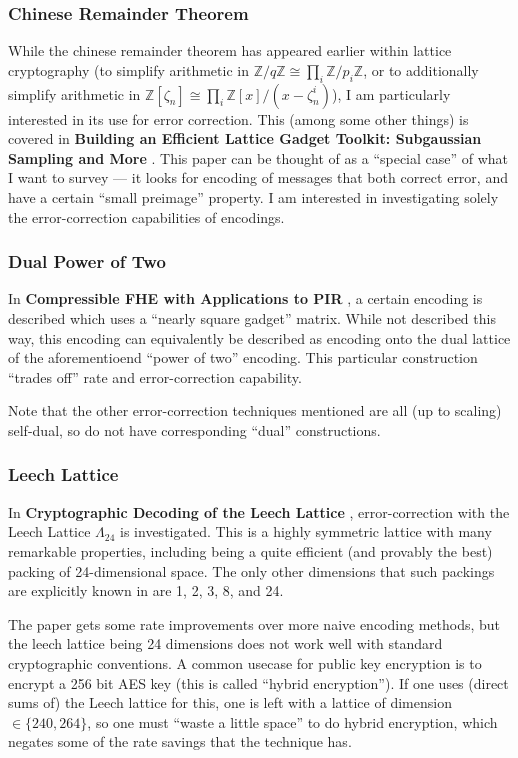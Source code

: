 \documentclass{article}
\begin{document}
\subsubsection{Chinese Remainder Theorem}
While the chinese remainder theorem has appeared earlier within lattice cryptography (to simplify arithmetic in $\mathbb{Z}/q\mathbb{Z}\cong \prod_i \mathbb{Z}/p_i\mathbb{Z}$, or to additionally simplify arithmetic in $\mathbb{Z}[\zeta_n]\cong \prod_i \mathbb{Z}[x] / (x - \zeta_n^i)$), I am particularly interested in its use for error correction.
This (among some other things) is covered in \textbf{Building an Efficient Lattice Gadget Toolkit: Subgaussian Sampling and More} \cite{ishai_building_2019}.
This paper can be thought of as a ``special case'' of what I want to survey --- it looks for encoding of messages that both correct error, and have a certain ``small preimage'' property.
I am interested in investigating solely the error-correction capabilities of encodings.

\subsubsection{Dual Power of Two}
In \textbf{Compressible FHE with Applications to PIR} \cite{hofheinz_compressible_2019}, a certain encoding is described which uses a ``nearly square gadget'' matrix.
While not described this way, this encoding can equivalently be described as encoding onto the dual lattice of the aforementioend ``power of two'' encoding.
This particular construction ``trades off'' rate and error-correction capability.

Note that the other error-correction techniques mentioned are all (up to scaling) self-dual, so do not have corresponding ``dual'' constructions.

\subsubsection{Leech Lattice}
In \textbf{Cryptographic Decoding of the Leech Lattice} \cite{van_poppelen_cryptographic_nodate}, error-correction with the Leech Lattice $\Lambda_{24}$ is investigated.
This is a highly symmetric lattice with many remarkable properties, including being a quite efficient (and provably the best) packing of 24-dimensional space.
The only other dimensions that such packings are explicitly known in are 1, 2, 3, 8, and 24.

The paper gets some rate improvements over more naive encoding methods, but the leech lattice being 24 dimensions does not work well with standard cryptographic conventions.
A common usecase for public key encryption is to encrypt a 256 bit AES key (this is called ``hybrid encryption'').
If one uses (direct sums of) the Leech lattice for this, one is left with a lattice of dimension $\in\{240, 264\}$, so one must ``waste a little space'' to do hybrid encryption, which negates some of the rate savings that the technique has.
\end{document}
